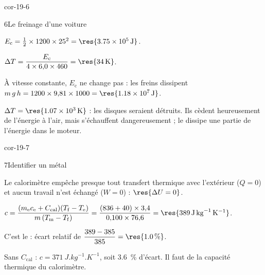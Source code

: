 \begin{blocLivre}{cor-19-6}
\begin{corrige}{6}{Le freinage d'une voiture}
\begin{questions}
\item $E_\mathrm{c}=\frac12\times1200\times25^2=\res{\qty{3,75e5}{J}}$.
\item $\Delta T=\dfrac{E_\mathrm{c}}{4\times6{,}0\times460}=\res{\qty{34}{K}}$.
\item À vitesse constante, $E_\mathrm{c}$ ne change pas : les freins dissipent $m\,g\,h=1200\times9{,}81\times1000=\res{\qty{1,18e7}{J}}$.
\item $\Delta T=\res{\qty{1,07e3}{K}}$ : les disques seraient détruits. Ils cèdent heureusement de l'énergie à l'air, mais
s'échauffent dangereusement ; le  dissipe une partie de l'énergie dans le moteur.
\end{questions}
\end{corrige}
\end{blocLivre}
\begin{blocLivre}{cor-19-7}
\begin{corrige}{7}{Identifier un métal}
\begin{questions}
\item Le calorimètre empêche presque tout transfert thermique avec l'extérieur ($Q=0$) et aucun travail n'est échangé
($W=0$) : $\res{\Delta U=0}$.
\item $c=\dfrac{(m_\mathrm{e}c_\mathrm{e}+C_\mathrm{cal})(T_\mathrm{f}-T_\mathrm{e})}{m\,(T_\mathrm{m}-T_\mathrm{f})}=\dfrac{(836+40)\times3{,}4}{0{,}100\times76{,}6}=\res{\qty{389}{J.kg^{-1}.K^{-1}}}$.
\item C'est le  : écart relatif de $\dfrac{389-385}{385}=\res{\qty{1,0}{\percent}}$.
\item Sans $C_\mathrm{cal}$ : $c=\qty{371}{J.kg^{-1}.K^{-1}}$, soit \qty{3,6}{\percent} d'écart. Il faut  de la
capacité thermique du calorimètre.
\end{questions}
\end{corrige}
\end{blocLivre}
